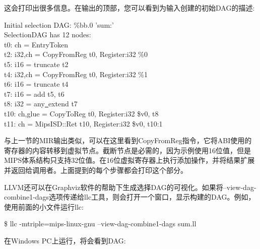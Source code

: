 这会打印出很多信息。在输出的顶部，您可以看到为输入创建的初始DAG的描述:\par

\begin{tcolorbox}[colback=white,colframe=black]
Initial selection DAG: \%bb.0 'sum:' \\
SelectionDAG has 12 nodes: \\
\hspace*{0.5cm}t0: ch = EntryToken \\
\hspace*{2.5cm}t2: i32,ch = CopyFromReg t0, Register:i32 \%0 \\
\hspace*{2cm}t5: i16 = truncate t2 \\
\hspace*{2.5cm}t4: i32,ch = CopyFromReg t0, Register:i32 \%1 \\
\hspace*{2cm}t6: i16 = truncate t4 \\
\hspace*{1.5cm}t7: i16 = add t5, t6 \\
\hspace*{1cm}t8: i32 = any\underline{~}extend t7 \\
\hspace*{0.5cm}t10: ch,glue = CopyToReg t0, Register:i32 \$v0, t8 \\
\hspace*{0.5cm}t11: ch = MipsISD::Ret t10, Register:i32 \$v0, t10:1 
\end{tcolorbox}

与上一节的MIR输出类似，可以在这里看到CopyFromReg指令，它将ABI使用的寄存器的内容转移到虚拟节点。截断节点是必需的，因为示例使用16位值，但是MIPS体系结构只支持32位值。在16位虚拟寄存器上执行添加操作，并将结果扩展并返回给调用者。上面提到的每个步骤都会打印这个部分。\par

LLVM还可以在Graphviz软件的帮助下生成选择DAG的可视化。如果将–view-dag-combine1-dags选项传递给llc工具，则会打开一个窗口，显示构建的DAG。例如，使用前面的小文件运行llc:\par

\begin{tcolorbox}[colback=white,colframe=black]
\$ llc -mtriple=mips-linux-gnu –view-dag-combine1-dags sum.ll
\end{tcolorbox}

在Windows PC上运行，将会看到DAG:\par

